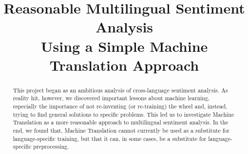 \documentclass[11pt,a4paper]{article}
\title{Reasonable Multilingual Sentiment Analysis\\Using a Simple Machine Translation Approach}
\date{}
\begin{document}
\maketitle
\begin{abstract}
This project began as an ambitious analysis of cross-language sentiment analysis. As reality hit, however, we discovered important lessons about machine learning, especially the importance of not re-inventing (or re-training) the wheel and, instead, trying to find general solutions to specific problems. This led us to investigate Machine Translation as a more reasonable approach to multilingual sentiment analysis. In the end, we found that, Machine Translation cannot currently be used as a substitute for language-specific training, but that it can, in some cases, be a substitute for language-specific preprocessing.
\end{abstract}
\end{document}
